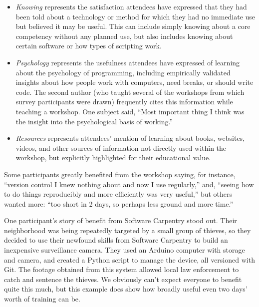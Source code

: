 \documentclass[10pt, twocolumn]{article}
\begin{document}
\begin{itemize}

    \item
    \emph{Knowing} represents the satisfaction attendees have expressed that they had been told about a technology or method
    for which they had no immediate use but believed it may be useful.
    This can include simply knowing about a core competency without any planned use,
    but also includes knowing about certain software or how types of scripting work.
    
    \item
    \emph{Psychology} represents the usefulness attendees have expressed of learning about the psychology of programming,
    including empirically validated insights about how people work with computers,
    need breaks,
    or should write code.
    The second author (who taught several of the workshops from which survey participants were drawn)
    frequently cites this information while teaching a workshop.
        One subject said,
        ``Most important thing I think was the insight into the psychological basis of working.''
    
    \item
    \emph{Resources} represents attendees' mention of learning about books, websites, videos, and other sources of information
    not directly used within the workshop,
    but explicitly highlighted for their educational value.

\end{itemize}

Some participants greatly benefited from the workshop saying,
for instance,
``version control I knew nothing about and now I use regularly,''
and,
``seeing how to do things reproducibly and more efficiently was very useful,''
but others wanted more:
``too short in 2 days, so perhaps less ground and more time.''

One participant's story of benefit from Software Carpentry stood out.
Their neighborhood was being repeatedly targeted by a small group of thieves,
so they decided to use their newfound skills from Software Carpentry to build an inexpensive surveillance camera.
They used an Arduino computer with storage and camera,
and created a Python script to manage the device,
all versioned with Git.
The footage obtained from this system allowed local law enforcement to catch and sentence the thieves.
We obviously can't expect everyone to benefit quite this much,
but this example does show how broadly useful even two days' worth of training can be.
\end{document}
